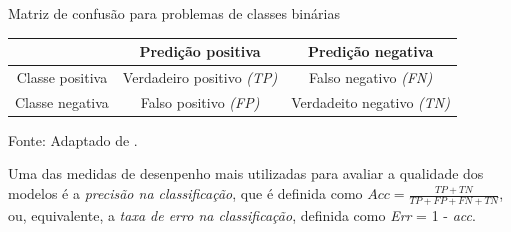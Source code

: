 \documentclass[
	12pt,				%
	openright,			%
	oneside,	
	a4paper,				%
	english,				%
	brazil				%
]{abntex2/abntex2} %
\begin{document}
		\begin{quadro}[htb]
			\centering
			\caption{\fontsize{10}{\baselineskip} \selectfont Matriz de confusão para problemas de classes binárias}
			\label{quadroMatrizConfusao}
			\begin{center}
				\renewcommand{\arraystretch}{2}
				\begin{tabular}{ccc}
					\hline
					               & \textbf{Predição positiva}               & \textbf{Predição negativa}         \\ \hline
					\multicolumn{1}{c|}{Classe positiva}                                      & Verdadeiro positivo \textit{(TP)}                                                                                 & Falso negativo \textit{(FN)} 							                                                                                    
					\\
					\multicolumn{1}{c|}{Classe negativa}                                      & Falso positivo \textit{(FP)}                                                                                  &Verdadeito negativo \textit{(TN)} 							                                                                                   							            
					\\ 
					\hline
				\end{tabular}
			\end{center}
			{\fontsize{10}{\baselineskip} \selectfont Fonte: Adaptado de \cite{prati:2008}.}
		\end{quadro}
		

		Uma das medidas de desenpenho  mais utilizadas para avaliar a qualidade dos modelos é a \textit{precisão na classificação}, que é definida como $Acc = \frac{TP + TN}{TP + FP + FN + TN} $, ou, equivalente, a \textit{taxa de erro na classificação}, definida como \textit{Err} = 1 - \textit{acc}.
	
\end{document}
